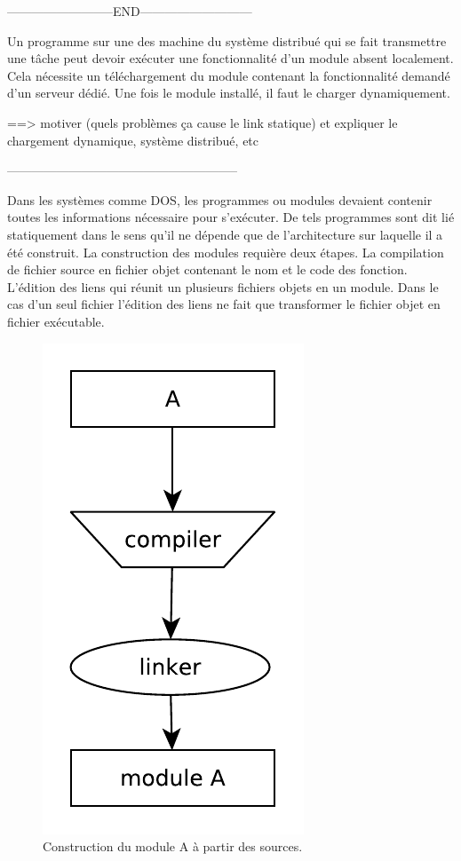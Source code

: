 --------------------------END---------------------------

Un programme sur une des machine du système distribué qui se fait transmettre
une tâche peut devoir exécuter une fonctionnalité d'un module absent
localement. Cela nécessite un téléchargement du module contenant la
fonctionnalité demandé d'un serveur dédié. Une fois le module installé, il faut
le charger dynamiquement.

==> motiver (quels problèmes ça cause le link statique) et expliquer le chargement dynamique, système distribué, etc



--------------------------------------------------------


Dans les systèmes comme DOS, les programmes ou modules devaient contenir toutes les
informations nécessaire pour s'exécuter. De tels programmes sont dit lié
statiquement dans le sens qu'il ne dépende que de l'architecture sur laquelle il
a été construit. La construction des modules requière deux étapes. La compilation
de fichier source en fichier objet contenant le nom et le code des fonction.
L'édition des liens qui réunit un plusieurs fichiers objets en un module.
Dans le cas d'un seul fichier l'édition des liens ne fait que transformer le fichier
objet en fichier exécutable.

\begin{figure}[ht]
  \includegraphics[width=0.20\linewidth]{figures/basic_module_compilation.pdf}
  \caption{Construction du module A à partir des sources.}
\end{figure}

